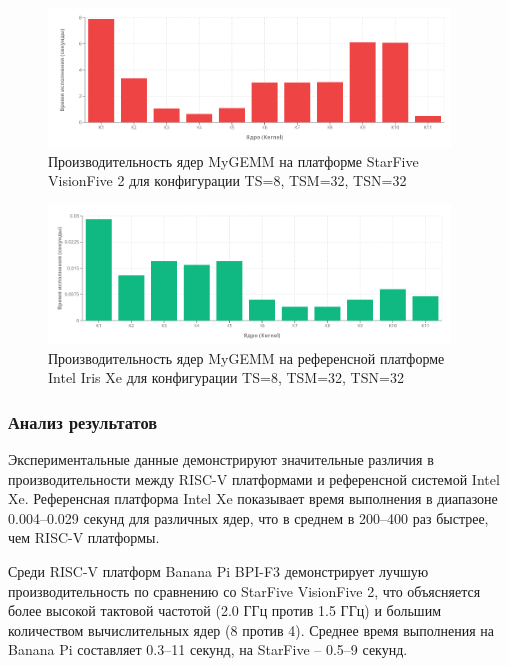 \begin{figure}[ht]
\centering
\includegraphics[width=0.95\textwidth]{figures/starfive_83232.png}
\caption{Производительность ядер MyGEMM на платформе StarFive VisionFive 2 для конфигурации TS=8, TSM=32, TSN=32}
\label{fig:perf_starfive}
\end{figure}

\begin{figure}[ht]
\centering
\includegraphics[width=0.95\textwidth]{figures/intel_xe_83232.png}
\caption{Производительность ядер MyGEMM на референсной платформе Intel Iris Xe для конфигурации TS=8, TSM=32, TSN=32}
\label{fig:perf_intelxe}
\end{figure}

\subsubsection{Анализ результатов}

Экспериментальные данные демонстрируют значительные различия в производительности между RISC-V платформами и референсной системой Intel Xe. Референсная платформа Intel Xe показывает время выполнения в диапазоне 0.004--0.029 секунд для различных ядер, что в среднем в 200--400 раз быстрее, чем RISC-V платформы.

Среди RISC-V платформ Banana Pi BPI-F3 демонстрирует лучшую производительность по сравнению со StarFive VisionFive 2, что объясняется более высокой тактовой частотой (2.0 ГГц против 1.5 ГГц) и большим количеством вычислительных ядер (8 против 4). Среднее время выполнения на Banana Pi составляет 0.3--11 секунд, на StarFive -- 0.5--9 секунд.

